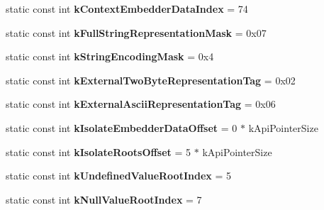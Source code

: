 \begin{DoxyCompactItemize}
\item 
\hypertarget{classv8_1_1internal_1_1Internals_afb65846499ec5f68172e4b2e8301a493}{static const int {\bfseries k\-Context\-Embedder\-Data\-Index} = 74}\label{classv8_1_1internal_1_1Internals_afb65846499ec5f68172e4b2e8301a493}

\item 
\hypertarget{classv8_1_1internal_1_1Internals_a5c39a86b30463928ea719def66916507}{static const int {\bfseries k\-Full\-String\-Representation\-Mask} = 0x07}\label{classv8_1_1internal_1_1Internals_a5c39a86b30463928ea719def66916507}

\item 
\hypertarget{classv8_1_1internal_1_1Internals_a1927ac3def13a57e03025e62ca46d1c5}{static const int {\bfseries k\-String\-Encoding\-Mask} = 0x4}\label{classv8_1_1internal_1_1Internals_a1927ac3def13a57e03025e62ca46d1c5}

\item 
\hypertarget{classv8_1_1internal_1_1Internals_a73faf917416d2519b65c7255e77a74ce}{static const int {\bfseries k\-External\-Two\-Byte\-Representation\-Tag} = 0x02}\label{classv8_1_1internal_1_1Internals_a73faf917416d2519b65c7255e77a74ce}

\item 
\hypertarget{classv8_1_1internal_1_1Internals_adea2f5a76d07821f7fa885a8dcda0eec}{static const int {\bfseries k\-External\-Ascii\-Representation\-Tag} = 0x06}\label{classv8_1_1internal_1_1Internals_adea2f5a76d07821f7fa885a8dcda0eec}

\item 
\hypertarget{classv8_1_1internal_1_1Internals_ad722bf4760df09958cd1062db4a5524c}{static const int {\bfseries k\-Isolate\-Embedder\-Data\-Offset} = 0 $\ast$ k\-Api\-Pointer\-Size}\label{classv8_1_1internal_1_1Internals_ad722bf4760df09958cd1062db4a5524c}

\item 
\hypertarget{classv8_1_1internal_1_1Internals_a3142f942a25203ce7fca0e9a4563c74d}{static const int {\bfseries k\-Isolate\-Roots\-Offset} = 5 $\ast$ k\-Api\-Pointer\-Size}\label{classv8_1_1internal_1_1Internals_a3142f942a25203ce7fca0e9a4563c74d}

\item 
\hypertarget{classv8_1_1internal_1_1Internals_a7281ff0eafed559e64613465b1a03296}{static const int {\bfseries k\-Undefined\-Value\-Root\-Index} = 5}\label{classv8_1_1internal_1_1Internals_a7281ff0eafed559e64613465b1a03296}

\item 
\hypertarget{classv8_1_1internal_1_1Internals_ab311cf753ec5c968052bd83ef21e83f8}{static const int {\bfseries k\-Null\-Value\-Root\-Index} = 7}\label{classv8_1_1internal_1_1Internals_ab311cf753ec5c968052bd83ef21e83f8}


\end{DoxyCompactItemize}
